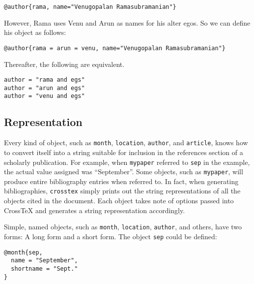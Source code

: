 \documentclass{article}
\begin{document}
\begin{small}\begin{verbatim}
@author{rama, name="Venugopalan Ramasubramanian"}
\end{verbatim}\end{small}

However, Rama uses Venu and Arun as names for his alter egos. So we can define his object as follows:

\begin{small}\begin{verbatim}
@author{rama = arun = venu, name="Venugopalan Ramasubramanian"}
\end{verbatim}\end{small}

Thereafter, the following are equivalent.

\begin{small}\begin{verbatim}
author = "rama and egs"
author = "arun and egs"
author = "venu and egs"
\end{verbatim}\end{small}

\subsection{Representation}

Every kind of object, such as \texttt{month}, \texttt{location}, \texttt{author}, and \texttt{article}, knows how to convert itself into a string suitable for inclusion in the references section of a scholarly publication. For example, when \texttt{mypaper} referred to \texttt{sep} in the example, the actual value assigned was ``September''. Some objects, such as \texttt{mypaper}, will produce entire bibliography entries when referred to. In fact, when generating bibliographies, \texttt{crosstex} simply prints out the string representations of all the objects cited in the document.  Each object takes note of options passed into CrossTeX and generates a string representation accordingly.

Simple, named objects, such as \texttt{month}, \texttt{location}, \texttt{author}, and others, have two forms: A long form and a short form. The object \texttt{sep} could be defined:

\begin{small}\begin{verbatim}
@month{sep,
  name = "September",
  shortname = "Sept."
}
\end{verbatim}\end{small}
\end{document}
